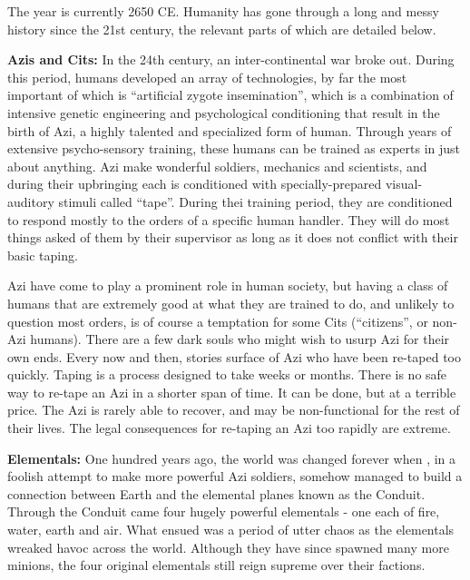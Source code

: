 \documentclass[blue]{elementals}
\begin{document}
\name{\bHumanHistory{}}

The year is currently 2650 CE. Humanity has gone through a long and messy history since the 21st century, the relevant parts of which are detailed below.

{\bf Azis and Cits:}
In the 24th century, an inter-continental war broke out. During this period, humans developed an array of technologies, by far the most important of which is ``artificial zygote insemination'', which is a combination of intensive genetic engineering and psychological conditioning that result in the birth of Azi, a highly talented and specialized form of human. Through years of extensive psycho-sensory training, these humans can be trained as experts in just about anything. Azi make wonderful soldiers, mechanics and scientists, and during their upbringing each is conditioned with specially-prepared visual-auditory stimuli called ``tape''. During thei training period, they are conditioned to respond mostly to the orders of a specific human handler. They will do most things asked of them by their supervisor as long as it does not conflict with their basic taping.

Azi have come to play a prominent role in human society, but having a class of humans that are extremely good at what they are trained to do, and unlikely to question most orders, is of course a temptation for some Cits (``citizens'', or non-Azi humans). There are a few dark souls who might wish to usurp Azi for their own ends. Every now and then, stories surface of Azi who have been re-taped too quickly.  Taping is a process designed to take weeks or months. There is no safe way to re-tape an Azi in a shorter span of time. It can be done, but at a terrible price. The Azi is rarely able to recover, and may be non-functional for the rest of their lives.  The legal consequences for re-taping an Azi too rapidly are extreme.

{\bf Elementals:}
One hundred years ago, the world was changed forever when \cGrandfather{}, in a foolish attempt to make more powerful Azi soldiers, somehow managed to build a connection between Earth and the elemental planes known as the Conduit. Through the Conduit came four hugely powerful elementals - one each of fire, water, earth and air. What ensued was a period of utter chaos as the elementals wreaked havoc across the world. Although they have since spawned many more minions, the four original elementals still reign supreme over their factions.
\end{document}
